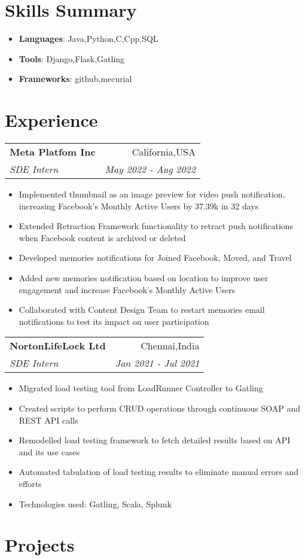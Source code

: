 \documentclass[letterpaper,10.8pt]{article}
\makeatletter
\newcommand{\resumeItem}[2]{
  \item\small{
    \textbf{#1}{: #2 \vspace{-2pt}}
  }
}
\newcommand{\resumeSubheading}[4]{
  \vspace{-1pt}\item
    \begin{tabular*}{0.97\textwidth}{l@{\extracolsep{\fill}}r}
      \textbf{#1} & #2 \\
      \textit{\small#3} & \textit{\small #4} \\
    \end{tabular*}\vspace{-5pt}
}
\newcommand{\resumeSubItem}[2]{\resumeItem{#1}{#2}\vspace{-4pt}}
\newcommand{\resumeSubHeadingListStart}{\begin{itemize}[leftmargin=*]}
\newcommand{\resumeSubHeadingListEnd}{\end{itemize}}
\makeatother
\begin{document}
    \section{Skills Summary}
	\resumeSubHeadingListStart
    \resumeSubItem{Languages}{Java,Python,C,Cpp,SQL}\resumeSubItem{Tools}{Django,Flask,Gatling}\resumeSubItem{Frameworks}{github,mecurial}\resumeSubHeadingListEnd\section{Experience}
    \resumeSubheading
    {Meta Platfom Inc}{California,USA}
    {SDE Intern }{May 2022 - Aug 2022}
    \begin{itemize}
    \itemsep0em 
    \item { Implemented thumbnail as an image preview for video push notification, increasing Facebook’s Monthly Active Users by 37.39k in 32 days}\item { Extended Retraction Framework functionality to retract push notifications when Facebook content is archived or deleted}\item { Developed memories notifications for Joined Facebook, Moved, and Travel}\item { Added new memories notification based on location to improve user engagement and increase Facebook’s Monthly Active Users}\item { Collaborated with Content Design Team to restart memories email notifications to test its impact on user participation}\end{itemize}
    \resumeSubheading
    {NortonLifeLock Ltd}{Chennai,India}
    {SDE Intern }{Jan 2021 - Jul 2021}
    \begin{itemize}
    \itemsep0em 
    \item { Migrated load testing tool from LoadRunner Controller to Gatling }\item { Created scripts to perform CRUD operations through continuous SOAP and REST API calls }\item { Remodelled load testing framework to fetch detailed results based on API and its use cases }\item { Automated tabulation of load testing results to eliminate manual errors and efforts }\item { Technologies used: Gatling, Scala, Splunk}\end{itemize}\section{Projects}
\end{document}
